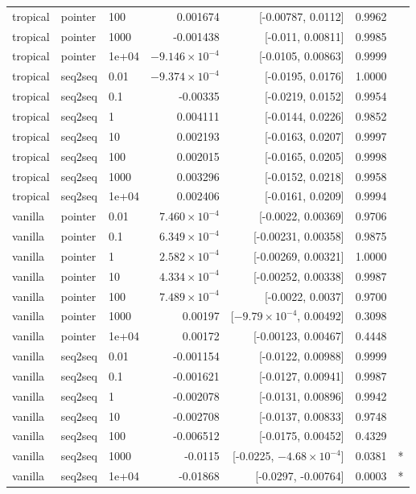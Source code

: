 \documentclass[10pt]{article}
\begin{document}
{\begin{longtable}{lllrrrl}
tropical & pointer & 100 & 0.001674 & [-0.00787, 0.0112] & 0.9962 & \\
tropical & pointer & 1000 & -0.001438 & [-0.011, 0.00811] & 0.9985 & \\
tropical & pointer & 1e+04 & $-9.146\times10^{-4}$ & [-0.0105, 0.00863] & 0.9999 & \\
tropical & seq2seq & 0.01 & $-9.374\times10^{-4}$ & [-0.0195, 0.0176] & 1.0000 & \\
tropical & seq2seq & 0.1 & -0.00335 & [-0.0219, 0.0152] & 0.9954 & \\
tropical & seq2seq & 1 & 0.004111 & [-0.0144, 0.0226] & 0.9852 & \\
tropical & seq2seq & 10 & 0.002193 & [-0.0163, 0.0207] & 0.9997 & \\
tropical & seq2seq & 100 & 0.002015 & [-0.0165, 0.0205] & 0.9998 & \\
tropical & seq2seq & 1000 & 0.003296 & [-0.0152, 0.0218] & 0.9958 & \\
tropical & seq2seq & 1e+04 & 0.002406 & [-0.0161, 0.0209] & 0.9994 & \\
vanilla & pointer & 0.01 & $7.460\times10^{-4}$ & [-0.0022, 0.00369] & 0.9706 & \\
vanilla & pointer & 0.1 & $6.349\times10^{-4}$ & [-0.00231, 0.00358] & 0.9875 & \\
vanilla & pointer & 1 & $2.582\times10^{-4}$ & [-0.00269, 0.00321] & 1.0000 & \\
vanilla & pointer & 10 & $4.334\times10^{-4}$ & [-0.00252, 0.00338] & 0.9987 & \\
vanilla & pointer & 100 & $7.489\times10^{-4}$ & [-0.0022, 0.0037] & 0.9700 & \\
vanilla & pointer & 1000 & 0.00197 & [$-9.79\times10^{-4}$, 0.00492] & 0.3098 & \\
vanilla & pointer & 1e+04 & 0.00172 & [-0.00123, 0.00467] & 0.4448 & \\
vanilla & seq2seq & 0.01 & -0.001154 & [-0.0122, 0.00988] & 0.9999 & \\
vanilla & seq2seq & 0.1 & -0.001621 & [-0.0127, 0.00941] & 0.9987 & \\
vanilla & seq2seq & 1 & -0.002078 & [-0.0131, 0.00896] & 0.9942 & \\
vanilla & seq2seq & 10 & -0.002708 & [-0.0137, 0.00833] & 0.9748 & \\
vanilla & seq2seq & 100 & -0.006512 & [-0.0175, 0.00452] & 0.4329 & \\
vanilla & seq2seq & 1000 & -0.0115 & [-0.0225, $-4.68\times10^{-4}$] & 0.0381 & *\\
vanilla & seq2seq & 1e+04 & -0.01868 & [-0.0297, -0.00764] & 0.0003 & *\\
\bottomrule
\end{longtable}
}
\end{document}
